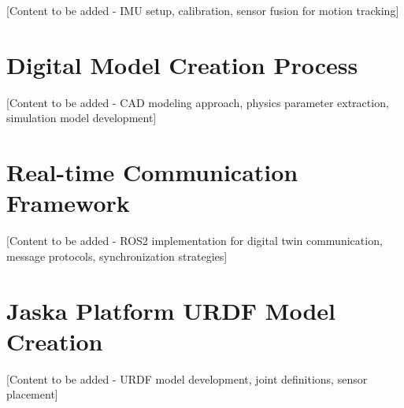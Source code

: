 [Content to be added - IMU setup, calibration, sensor fusion for motion tracking]

\section{Digital Model Creation Process}

[Content to be added - CAD modeling approach, physics parameter extraction, simulation model development]

\section{Real-time Communication Framework}

[Content to be added - ROS2 implementation for digital twin communication, message protocols, synchronization strategies]

\section{Jaska Platform URDF Model Creation}

[Content to be added - URDF model development, joint definitions, sensor placement]
